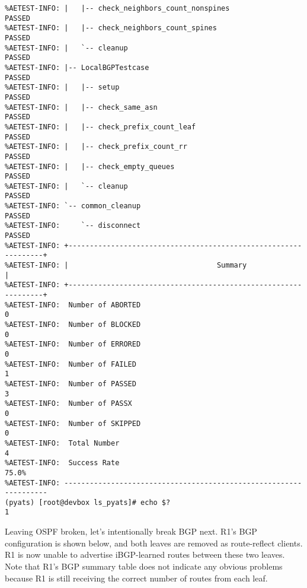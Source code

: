 \begin{verbatim}
%AETEST-INFO: |   |-- check_neighbors_count_nonspines                     PASSED
%AETEST-INFO: |   |-- check_neighbors_count_spines                        PASSED
%AETEST-INFO: |   `-- cleanup                                             PASSED
%AETEST-INFO: |-- LocalBGPTestcase                                        PASSED
%AETEST-INFO: |   |-- setup                                               PASSED
%AETEST-INFO: |   |-- check_same_asn                                      PASSED
%AETEST-INFO: |   |-- check_prefix_count_leaf                             PASSED
%AETEST-INFO: |   |-- check_prefix_count_rr                               PASSED
%AETEST-INFO: |   |-- check_empty_queues                                  PASSED
%AETEST-INFO: |   `-- cleanup                                             PASSED
%AETEST-INFO: `-- common_cleanup                                          PASSED
%AETEST-INFO:     `-- disconnect                                          PASSED
%AETEST-INFO: +----------------------------------------------------------------+
%AETEST-INFO: |                                   Summary                      |
%AETEST-INFO: +----------------------------------------------------------------+
%AETEST-INFO:  Number of ABORTED                                              0
%AETEST-INFO:  Number of BLOCKED                                              0
%AETEST-INFO:  Number of ERRORED                                              0
%AETEST-INFO:  Number of FAILED                                               1
%AETEST-INFO:  Number of PASSED                                               3
%AETEST-INFO:  Number of PASSX                                                0
%AETEST-INFO:  Number of SKIPPED                                              0
%AETEST-INFO:  Total Number                                                   4
%AETEST-INFO:  Success Rate                                               75.0%
%AETEST-INFO: ------------------------------------------------------------------
(pyats) [root@devbox ls_pyats]# echo $?
1
\end{verbatim}

Leaving OSPF broken, let's intentionally break BGP next. R1's BGP configuration
is shown below, and both leaves are removed as route-reflect clients. R1 is now
unable to advertise iBGP-learned routes between these two leaves. Note that
R1's BGP summary table does not indicate any obvious problems because R1 is
still receiving the correct number of routes from each leaf.

